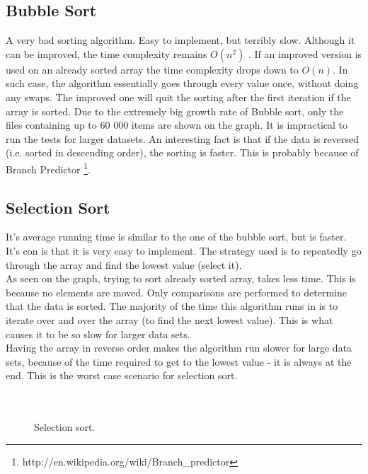 \documentclass{acm_proc_article-sp}
\begin{document}
\subsection{Bubble Sort}
A very bad sorting algorithm. Easy to implement, but terribly slow. Although it can be improved, the time complexity remains $O(n^2)$ . If an improved version is used on an already sorted array the time complexity drops down to  $O(n)$. In such case, the algorithm essentially goes through every value once, without doing any swaps. The improved one will quit the sorting after the first iteration if the array is sorted. Due to the extremely big growth rate of Bubble sort, only the files containing up to 60 000 items are shown on the graph. It is impractical to run the tests for larger datasets. An interesting fact is that if the data is reversed (i.e. sorted in descending order), the sorting is faster. This is probably because of Branch Predictor \footnote{http://en.wikipedia.org/wiki/Branch\_predictor}.
\subsection{Selection Sort}
It's average running time is similar to the one of the bubble sort, but is faster. It's con is that it is very easy to implement. The strategy used is to repeatedly go through the array and find the lowest value (select it).\\
 As seen on the graph, trying to sort already sorted array, takes less time. This is because no elements are moved. Only comparisons are performed to determine that the data is sorted. The majority of the time this algorithm runs in is to iterate over and over the array (to find the next lowest value). This is what causes it to be so slow for larger data sets. \\
 Having the array in reverse order makes the algorithm run slower for large data sets, because of the time required to get to the lowest value - it is always at the end. This is the worst case scenario for selection sort. \\\\\\
\begin{figure}[!htb]
\caption{Selection sort.}
\end{figure}
\end{document}
